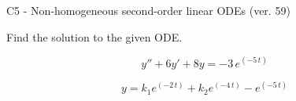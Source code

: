 \begin{exercise}
  \begin{exerciseTitle}C5 - Non-homogeneous second-order linear ODEs (ver. 59)\end{exerciseTitle}
  \begin{exerciseStatement}
    
Find the solution to the given ODE.

    
\[y''+6y'+8y = -3 \, e^{\left(-5 \, t\right)}\]

  \end{exerciseStatement}
  \begin{exerciseAnswer}
    
\[y= k_{1} e^{\left(-2 \, t\right)} + k_{2} e^{\left(-4 \, t\right)} - e^{\left(-5 \, t\right)}\]

  \end{exerciseAnswer}
\end{exercise}
